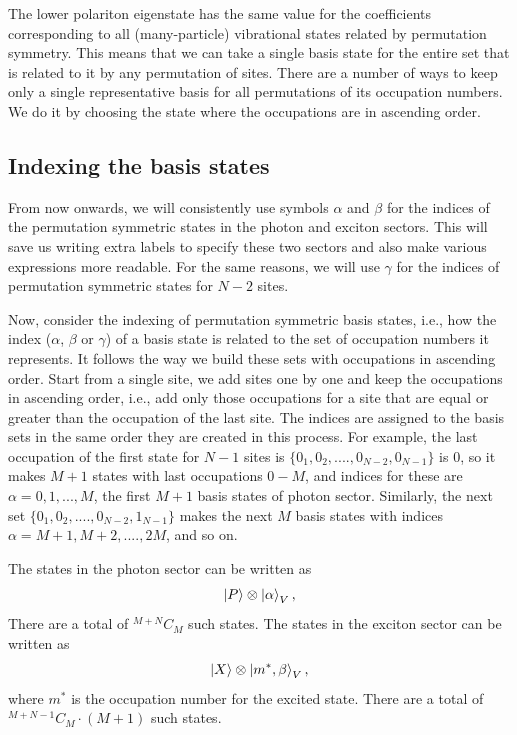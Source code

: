 \documentclass[final,twocolumn]{elsarticle}
\begin{document}
\begin{small}
The lower polariton eigenstate has the same value for the coefficients corresponding to all (many-particle) vibrational states related by permutation symmetry.
This means that we can take a single basis state for the entire set that is related to it by any permutation of sites.
There are a number of ways to keep only a single representative basis for all permutations of its occupation numbers.
We do it by
choosing the state where the occupations are in ascending order.
\subsection{Indexing the basis states}
From now onwards, 
we will consistently use symbols $\alpha$ and $\beta$ for the indices of the permutation symmetric states in the photon and exciton sectors. This will save us writing extra labels to specify these two sectors and also make various expressions more readable. 
For the same reasons, we will use $\gamma$ for the indices of permutation symmetric states for $N-2$ sites.

Now, consider the indexing of permutation symmetric basis states, i.e., how the index ($\alpha$, $\beta$ or $\gamma$) of a basis state is related to the set of occupation numbers it represents.
It follows the way we build these sets with occupations in ascending order.
Start from a single site, we add sites one by one and keep the occupations in ascending order, i.e., add only those occupations for a site that are equal or greater than the
occupation of the last site. 
The indices are assigned to the basis sets in the same order they are created in this process. 
For example, the last occupation of the first state for $N-1$ sites
is $\{0_1,0_2,....,0_{N-2},0_{N-1}\}$ is $0$, so it makes
$M+1$ states with last occupations $0-M$, and indices for these are $\alpha=0,1,...,M$, the first $M+1$ basis states of photon sector.
Similarly, the next set 
$\{0_1,0_2,....,0_{N-2},1_{N-1}\}$ makes the next $M$ basis states with indices $\alpha=M+1,M+2,....,2M$, and so on.



The states in the photon sector can be written as
\begin{gather}\nonumber
\ket{P}\otimes\ket{\alpha}_V,
\end{gather}
There are a total of
${}^{M+N}C_{M}$ such states.
The states in the exciton sector can be written as
\begin{gather}\nonumber
\ket{X}\otimes\ket{m^\ast,\beta}_V,
\end{gather}
where $m^\ast$ is the occupation number for the excited state.
There are a total of
${}^{M+N-1}C_{M}\cdot(M+1)$ such states.



\end{small}
\end{document}
